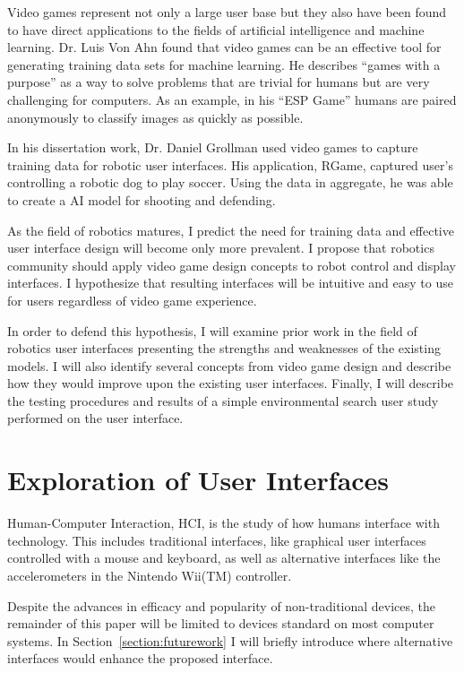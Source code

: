 Video games represent not only a large user base but they also have been found to have direct applications to the fields of artificial intelligence and machine learning. Dr. Luis Von Ahn found that video games can be an effective tool for generating training data sets for machine learning. He describes ``games with a purpose'' as a way to solve problems that are trivial for humans but are very challenging for computers. As an example, in his ``ESP Game'' humans are paired anonymously to classify images as quickly as possible.

In his dissertation work, Dr. Daniel Grollman used video games to capture training data for robotic user interfaces. His application, RGame, captured user's controlling a robotic dog to play soccer. Using the data in aggregate, he was able to create a AI model for shooting and defending.

As the field of robotics matures, I predict the need for training data and effective user interface design will become only more prevalent. I propose that robotics community should apply video game design concepts to robot control and display interfaces. I hypothesize that resulting interfaces will be intuitive and easy to use for users regardless of video game experience.

In order to defend this hypothesis, I will examine prior work in the field of robotics user interfaces presenting the strengths and weaknesses of the existing models. I will also identify several concepts from video game design and describe how they would improve upon the existing user interfaces.  Finally, I will describe the testing procedures and results of a simple environmental search user study performed on the user interface.

\chapter{Exploration of User Interfaces}
\label{chapter:ui}

Human-Computer Interaction, HCI, is the study of how humans interface with technology. This includes traditional interfaces, like graphical user interfaces controlled with a mouse and keyboard, as well as alternative interfaces like the accelerometers in the Nintendo Wii(TM) controller.

Despite the advances in efficacy and popularity of non-traditional devices, the remainder of this paper will be limited to devices standard on most computer systems. In Section~\ref{section:futurework} I will briefly introduce where alternative interfaces would enhance the proposed interface.

